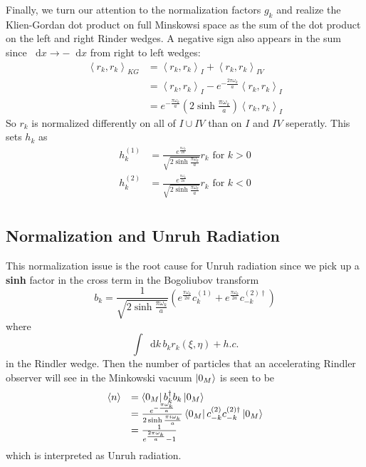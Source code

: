 \documentclass[12pt,a4paper]{article}
\newcommand*\diff{\mathop{}\!\mathrm{d}}
\begin{document}
Finally, we turn our attention to the normalization factors $g_k$ and realize the Klien-Gordan dot product on full Minskowsi space as the sum of the dot product on the left and right Rinder wedges.  A negative sign also appears in the sum since $\diff x \rightarrow -\diff x$ from right to left wedges:
\begin{equation}
 \begin{array}{ll}
  \left< r_k, r_k \right>_{KG} &= \left< r_k, r_k \right>_{I} + \left< r_k, r_k \right>_{IV} \\
  &= \left< r_k, r_k \right>_{I} - e^{- \frac{2\pi \omega_k}{a}} \left< r_k, r_k \right>_{I} \\
  &= e^{-\frac{\pi \omega_k}{a}} (2 \sinh \frac{\pi \omega_k}{a}) \left< r_k, r_k \right>_{I}
  \end{array}
\end{equation}
So $r_k$ is normalized differently on all of $I \cup IV$ than on $I$ and $IV$ seperatly.  This sets $h_k$ as
\begin{equation}
  \begin{array}{ll}
    h_k^{(1)} &= \frac{e^\frac{\pi \omega_k}{2a}}{\sqrt{2 \sinh \frac{\pi \omega_k}{a}}} r_k \text{ for } k>0\\
    h_k^{(2)} &= \frac{e^\frac{\pi \omega_k}{2a}}{\sqrt{2 \sinh \frac{\pi \omega_k}{a}}} r_k \text{ for } k<0\\
  \end{array}
\end{equation}

\subsection{Normalization and Unruh Radiation}
This normalization issue is the root cause for Unruh radiation since we pick up a {\bf sinh} factor in the cross term in the Bogoliubov transform
\begin{equation}
  b_k = \frac{1}{\sqrt{2 \sinh \frac{\pi \omega_k}{a}}} \left( e^\frac{\pi \omega_k}{2a} c_k^{(1)} + e^\frac{\pi \omega_k}{2a} c_{-k}^{(2)\dagger} \right)
\label{bogo}
\end{equation}
where
\begin{equation}
  \int \diff k \, b_k r_k(\xi,\eta) + h.c.
\end{equation}
in the Rindler wedge. Then the number of particles that an accelerating Rindler observer will see in the Minkowski vacuum $\ket{0_M}$ is seen to be 
\begin{equation}
  \label{radeq}
  \begin{array}{ll}
    \braket{n} &= \bra{0_M} b_k^\dagger b_k \ket{0_M} \\
               &= \frac{e^{-\frac{\pi \omega_k}{a}}}{2 \sinh \frac{\pi i \omega_k}{a}}\bra{0_M}  c_{-k}^{(2)} c_{-k}^{(2)\dagger} \ket{0_M} \\
               &= \frac{1}{e^{\frac{2 \pi \omega_k}{a}}-1} \\
  \end{array}
\end{equation}
which is interpreted as Unruh radiation.
\end{document}
